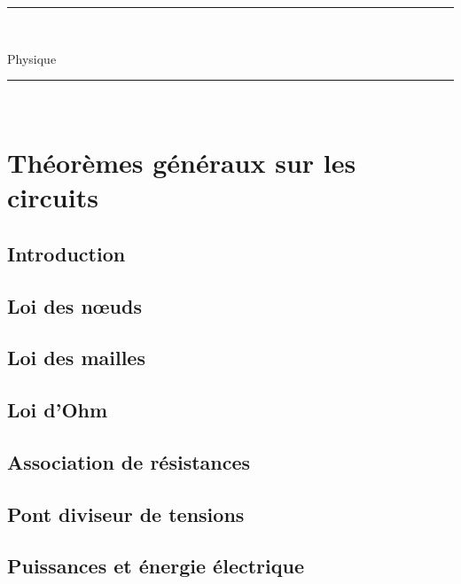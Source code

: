 \documentclass[11pt,a4paper,openany]{book}
\title{}
\author{Serrurot Gabin\\
BTS SNIR}
\date{\today}
\begin{document}
\sloppy

\begin{minipage}{0.9\linewidth}
\rule{\linewidth}{0.5mm}\\[0.2cm]
\huge\bfseries
\begin{center}
Physique
\end{center}
\rule{\linewidth}{0.5mm}\\[0.2cm]
\maketitle
\end{minipage}

\newpage

\tableofcontents

\newpage

\chapter{Théorèmes généraux sur les circuits}

\section{Introduction}

\section{Loi des nœuds}

\section{Loi des mailles}

\section{Loi d'Ohm}

\section{Association de résistances}

\section{Pont diviseur de tensions}

\section{Puissances et énergie électrique}
\end{document}
